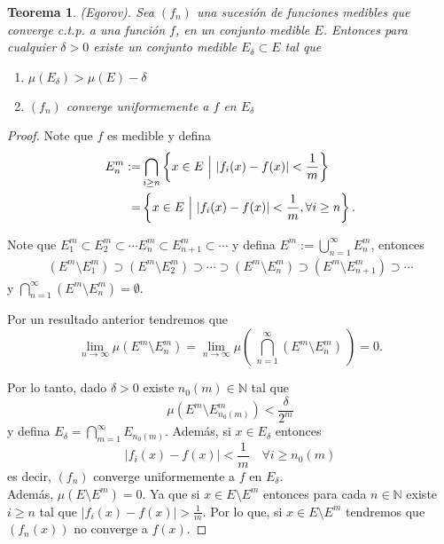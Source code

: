 \documentclass[twoside,12pt,a4 paper,openright]{book}
\newtheorem{teo}[claim]{Teorema}
\begin{document}
\begin{teo}(Egorov). Sea $(f_n)$ una sucesi\'on de funciones medibles que converge c.t.p. a una funci\'on $f$, en un conjunto medible $E$. Entonces para cualquier $\delta>0$ existe un conjunto medible $E_\delta \subset E$ tal que 
\begin{enumerate}
    \item $\mu(E_\delta)>\mu(E) - \delta$
    \item $(f_n)$ converge uniformemente a $f$ en $E_\delta$
\end{enumerate}
\end{teo}
\begin{proof}
    Note que $f$ es medible  y defina
    \begin{align*}
    E_n^m := &  \bigcap_{i\geq n} \left\{x\in E \ \Big{|} \  |f_i(x) - f(x)| < \frac{1}{m}\right\}\\
    =  & \left\{x\in E \ \Big{|} \ |f_i(x) - f(x)| < \frac{1}{m}, \forall i \geq n\right\}. 
    \end{align*}

    Note que $E_1^m \subset E_2^m \subset \cdots  E_{n}^m \subset E_{n+1}^m \subset \cdots$ y  defina  $\displaystyle E^m := \bigcup_{n=1}^{\infty} E_n^m$, entonces
\begin{align*}
(E^m\setminus E_1^m)\supset (E^m\setminus E_2^m)\supset \cdots  \supset (E^m\setminus E_n^m)\supset (E^m\setminus E_{n+1}^m) \supset \cdots   
 \end{align*} 
 y $ \displaystyle 
 \bigcap_{n=1}^{\infty}(E^m\setminus E_n^m)=\emptyset$.

Por un resultado anterior tendremos que 
  $$\displaystyle \lim_{n\to \infty} \mu(E^m\setminus E_n^m) = \lim_{n\to \infty} \mu ( \  \bigcap_{n=1}^{\infty}(E^m\setminus E_n^m)  \  ) = 0.$$ 

Por lo tanto,  dado $\delta> 0$ existe   $n_0(m)\in \mathbb N$ tal que 
$$\displaystyle\mu(E^m\setminus E_{n_0(m)}^m)<\frac{\delta}{2^m}$$ y defina 
$\displaystyle E_\delta = \bigcap_{m=1}^{\infty} E_{n_0(m)}$. Adem\'as, si  $x\in E_\delta$ entonces 
    $$|f_i(x) - f(x)|<\frac{1}{m}\quad\forall i \geq n_0(m)$$
    es decir, $(f_n)$ converge uniformemente a $f$ en $E_\delta$. 
    \\
    Adem\'as,   $\mu(E\setminus E^m)= 0$. Ya que  si $x\in E\setminus E^m$ entonces para cada $n\in \mathbb{N}$ existe $i\geq n$ tal que $\displaystyle|f_i(x)-f(x)|>\frac{1}{m}$. Por lo que, si  $x\in E\setminus E^m$ tendremos que  $(f_n(x))$ no converge  a $f(x)$.
    

\end{proof}
\end{document}
